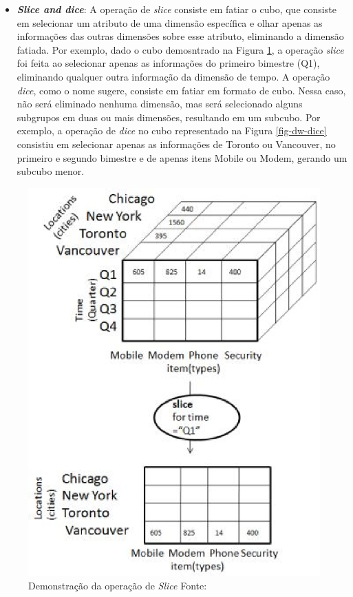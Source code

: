 \begin{itemize}
	\item \textbf{\emph{Slice and dice}}: A operação de \emph{slice} consiste em fatiar o cubo, que consiste em selecionar um atributo de uma dimensão específica e olhar apenas as informações das outras dimensões sobre esse atributo, eliminando a dimensão fatiada. Por exemplo, dado o cubo demosntrado na Figura \ref{fig-dw-slice}, a operação \emph{slice} foi feita ao selecionar apenas as informações do primeiro bimestre (Q1), eliminando qualquer outra informação da dimensão de tempo. A operação \emph{dice}, como o nome sugere, consiste em fatiar em formato de cubo. Nessa caso, não será eliminado nenhuma dimensão, mas será selecionado alguns subgrupos em duas ou mais dimensões, resultando em um subcubo. Por exemplo,  a operação de \emph{dice} no cubo representado na Figura \ref{fig-dw-dice} consistiu em selecionar apenas as informações de Toronto ou Vancouver, no primeiro e segundo bimestre e de apenas itens Mobile ou Modem, gerando um subcubo menor.
\end{itemize}

 \begin{figure}[!htb]
 	\centering
 		\includegraphics[scale=0.7]{figuras/dw-slice}
 		\caption{Demonstração da operação de \emph{Slice}    Fonte: \cite{TutorialsPoint}}
 		\label{fig-dw-slice}
 \end{figure}

